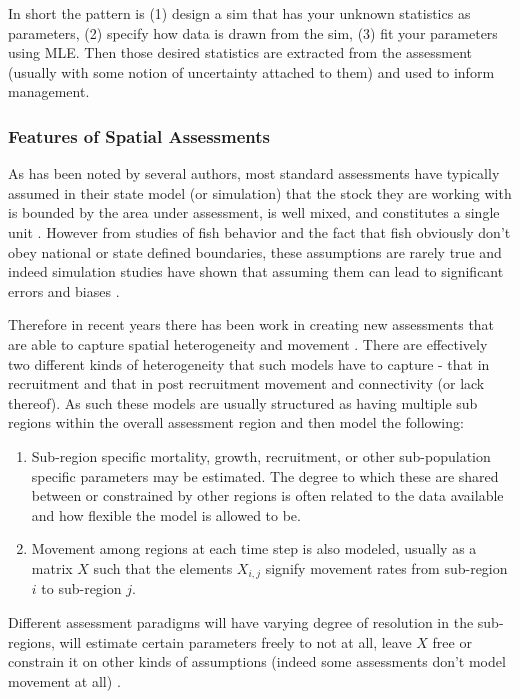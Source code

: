 \documentclass[11pt]{article}
\begin{document}
In short the pattern is (1) design a sim that has your unknown statistics as parameters, (2) specify how data is drawn from the sim, (3) fit your parameters using MLE. Then those desired statistics are extracted from the assessment (usually with some notion of uncertainty attached to them) and used to inform management. 

\subsubsection{Features of Spatial Assessments}

As has been noted by several authors, most standard assessments have typically assumed in their state model (or simulation) that the stock they are working with is bounded by the area under assessment, is well mixed, and constitutes a single unit \citep{sippel2014} \citep{punt2019} \citep{goethel2023}. However from studies of fish behavior and the fact that fish obviously don't obey national or state defined boundaries, these assumptions are rarely true and indeed simulation studies have shown that assuming them can lead to significant errors and biases \citep{lorenzen2010}. 

Therefore in recent years there has been work in creating new assessments that are able to capture spatial heterogeneity and movement \citep{punt2019} \citep{cadrin2020}. There are effectively two different kinds of heterogeneity that such models have to capture - that in recruitment and that in post recruitment movement and connectivity (or lack thereof). As such these models are usually structured as having multiple sub regions within the overall assessment region and then model the following:

\begin{enumerate}
\item Sub-region specific mortality, growth, recruitment, or other sub-population specific parameters may be estimated. The degree to which these are shared between or constrained by other regions is often related to the data available and how flexible the model is allowed to be.
\item Movement among regions at each time step is also modeled, usually as a matrix $X$ such that the elements $X_{i,j}$ signify movement rates from sub-region $i$ to sub-region $j$. 
\end{enumerate} 

Different assessment paradigms will have varying degree of resolution in the sub-regions, will estimate certain parameters freely to not at all, leave $X$ free or constrain it on other kinds of assumptions (indeed some assessments don't model movement at all) \citep{punt2019} \citep{goethel2023}. 
\end{document}
